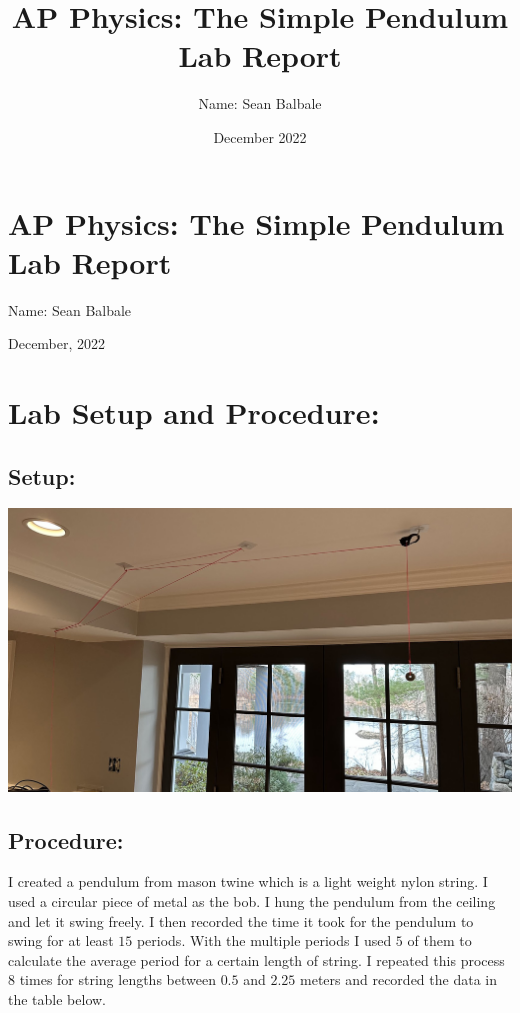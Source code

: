 \documentclass[12pt]{extarticle}
\author{Name: Sean Balbale}
\date{December 2022}
\title{AP Physics: The Simple Pendulum Lab Report}
\begin{document}
\section*{AP Physics: The Simple Pendulum Lab Report}
\begin{enumerate*}[label={}]
    \item Name: Sean Balbale
    \item December, 2022
\end{enumerate*}
\pagebreak
\tableofcontents
\pagebreak

\section{Lab Setup and Procedure:}
\subsection{Setup:}
\includegraphics[scale=0.25]{Still Frame Lab Setup.png}
\subsection{Procedure:}
I created a pendulum from mason twine which is a light weight nylon string. I used a circular piece of metal as the bob.
I hung the pendulum from the ceiling and let it swing freely. I then recorded the time it took for the pendulum to swing for at least $15$ periods.
With the multiple periods I used $5$ of them to calculate the average period for a certain length of string.
I repeated this process $8$ times for string lengths between $0.5$ and $2.25$ meters and recorded the data in the table below.

\pagebreak
\end{document}
